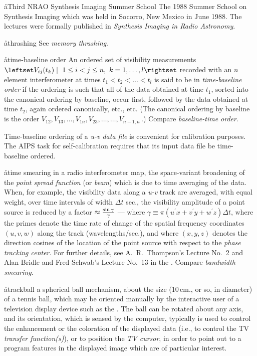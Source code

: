 \aa{Third NRAO Synthesis Imaging Summer School}
The 1988 Summer School
on Synthesis Imaging which was held in Socorro, New Mexico in June 1988.
The lectures were formally published in {\it Synthesis Imaging in Radio
Astronomy}.

\aa{thrashing} See {\it memory thrashing}.


\aa{time-baseline order}
An ordered set of visibility measurements
${\leftset V_{ij}(t_k)\mid\ 1\le i<j\le n,\ k=1,\dots,l\rightset}$
re\-cord\-ed with an $n$ element interferometer at times $t_1<t_2<\dots<t_l$
is said to be in {\it time-baseline order}
if the ordering is such that
all of the data obtained at time $t_1$, sorted
into the canonical ordering by baseline, occur first,
followed by the data obtained at time $t_2$, again ordered
canonically, etc., etc.
(The canonical ordering by baseline is the order
$V_{12},V_{13},\dots,V_{1n},V_{23},\dots,\dots,V_{n-1,n}$\,.)
Compare {\it baseline-time order}.
\par
Time-baseline ordering of a {\it u-v data file} is convenient for
calibration purposes.
The AIPS task for self-calibration requires that its
input \uv data file be time-baseline ordered.

\aa{time smearing}
in a radio interferometer map, the space-variant broadening of
the {\it point spread function} (or {\it beam}\/) which is due to
time averaging of the data.
When, for example, the visibility data along a {\it u-v} track are averaged,
with equal weight, over time intervals of width $\Delta t$ sec.,
the visibility amplitude of a point source
is reduced by a factor $\approx{\sin\gamma\over\gamma}$ ---%
where $\gamma\equiv\pi(u^\prime x+v^\prime y+w^\prime z)\Delta t$, where
the primes denote the time rate of change of the spatial frequency
coordinates $(u,v,w)$ along the track (wavelengths/sec.),
and where $(x,y,z)$ denotes the direction cosines of the location
of the point source with respect to the {\it phase tracking center}.
For further details, see A.~R.~Thompson's Lecture No.~2
and Alan Bridle and Fred Schwab's Lecture No.~13 in the \sira.
Compare {\it bandwidth smearing}.

\aa{trackball}
a spherical ball mechanism, about the size
(10\,cm., or so, in diameter) of a tennis ball,
which may be oriented manually by the interactive user of
a television display device such as the \iis.
The ball can be rotated about any axis, and its orientation, which is
sensed by the computer,
typically is used to control the enhancement or the coloration of
the displayed data (i.e., to control the TV {\it transfer function(s)}\/),
or to position the {\it TV cursor}, in order
to point out to a program features in the displayed image
which are of particular interest.

